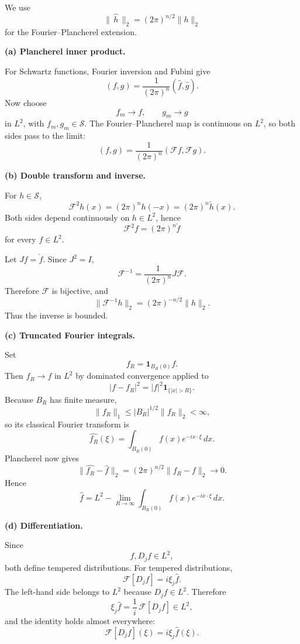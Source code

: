 \begin{solution}
We use
\[
\|\,\widehat h\,\|_2
=
(2\pi)^{n/2}\|h\|_2
\]
for the Fourier--Plancherel extension.

\par\smallskip\noindent\textbf{(a) Plancherel inner product.}

For Schwartz functions, Fourier inversion and Fubini give
\[
(f,g)
=
\frac1{(2\pi)^n}
(\widehat f,\widehat g).
\]
Now choose
\[
f_m\to f,
\qquad
g_m\to g
\]
in \(L^2\), with \(f_m,g_m\in\mathcal S\). The Fourier--Plancherel map is
continuous on \(L^2\), so both sides pass to the limit:
\[
\boxed{
(f,g)
=
\frac1{(2\pi)^n}
(\mathcal Ff,\mathcal Fg).}
\]

\par\smallskip\noindent\textbf{(b) Double transform and inverse.}

For \(h\in\mathcal S\),
\[
\mathcal F^2h(x)
=
(2\pi)^nh(-x)
=
(2\pi)^n\check h(x).
\]
Both sides depend continuously on \(h\in L^2\), hence
\[
\boxed{
\mathcal F^2f
=
(2\pi)^n\check f
}
\]
for every \(f\in L^2\).

Let \(Jf=\check f\). Since \(J^2=I\),
\[
\mathcal F^{-1}
=
\frac1{(2\pi)^n}
J\mathcal F.
\]
Therefore \(\mathcal F\) is bijective, and
\[
\|\mathcal F^{-1}h\|_2
=
(2\pi)^{-n/2}\|h\|_2.
\]
Thus the inverse is bounded.

\par\smallskip\noindent\textbf{(c) Truncated Fourier integrals.}

Set
\[
f_R
=
\mathbf1_{B_R(0)}f.
\]
Then \(f_R\to f\) in \(L^2\) by dominated convergence applied to
\[
|f-f_R|^2
=
|f|^2\mathbf1_{\{|x|>R\}}.
\]
Because \(B_R\) has finite measure,
\[
\|f_R\|_1
\le
|B_R|^{1/2}\|f_R\|_2<\infty,
\]
so its classical Fourier transform is
\[
\widehat{f_R}(\xi)
=
\int_{B_R(0)}
f(x)e^{-ix\cdot\xi}\,dx.
\]
Plancherel now gives
\[
\|\widehat{f_R}-\widehat f\|_2
=
(2\pi)^{n/2}\|f_R-f\|_2
\longrightarrow0.
\]
Hence
\[
\boxed{
\widehat f
=
L^2\!-\!\lim_{R\to\infty}
\int_{B_R(0)}
f(x)e^{-ix\cdot\xi}\,dx.}
\]

\par\smallskip\noindent\textbf{(d) Differentiation.}

Since
\[
f,D_jf\in L^2,
\]
both define tempered distributions. For tempered distributions,
\[
\mathcal F[D_jf]
=
i\xi_j\widehat f.
\]
The left-hand side belongs to \(L^2\) because \(D_jf\in L^2\). Therefore
\[
\xi_j\widehat f
=
\frac1i\,\mathcal F[D_jf]
\in L^2,
\]
and the identity holds almost everywhere:
\[
\boxed{
\mathcal F[D_jf](\xi)
=
i\xi_j\widehat f(\xi).}
\]


\end{solution}
